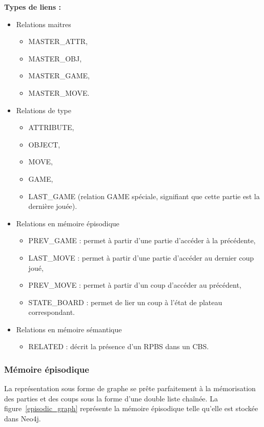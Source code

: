 \textbf{Types de liens :}
\begin{itemize}
	\item Relations maitres
		\begin{itemize}
			\item MASTER\_ATTR,
			\item MASTER\_OBJ,
			\item MASTER\_GAME,
			\item MASTER\_MOVE.
		\end{itemize}
	\item Relations de type
		\begin{itemize}
			\item ATTRIBUTE,
			\item OBJECT,
			\item MOVE,
			\item GAME,
			\item LAST\_GAME (relation GAME spéciale, signifiant que cette partie est la dernière jouée).
		\end{itemize}
	\item Relations en mémoire épisodique
		\begin{itemize}
			\item PREV\_GAME : permet à partir d'une partie d'accéder à la précédente,
			\item LAST\_MOVE : permet à partir d'une partie d'accéder au dernier coup joué,
			\item PREV\_MOVE : permet à partir d'un coup d'accéder au précédent,
			\item STATE\_BOARD : permet de lier un coup à l'état de plateau correspondant.
		\end{itemize}
	\item Relations en mémoire sémantique
		\begin{itemize}
			\item RELATED : décrit la présence d'un RPBS dans un CBS.
		\end{itemize}
	\end{itemize}

\subsubsection{Mémoire épisodique}

La représentation sous forme de graphe se prête parfaitement à la mémorisation des parties et des coups sous la forme d'une double liste chaînée. La figure~\ref{episodic_graph} représente la mémoire épisodique telle qu'elle est stockée dans Neo4j.

